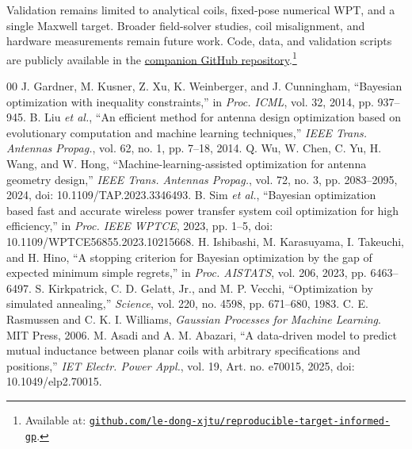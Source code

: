 \documentclass[10pt,conference,letterpaper]{IEEEtran}
\begin{document}
Validation remains limited to analytical coils, fixed-pose numerical WPT, and a single Maxwell target. Broader field-solver studies, coil misalignment, and hardware measurements remain future work. Code, data, and validation scripts are publicly available in the \href{https://github.com/le-dong-xjtu/reproducible-target-informed-gp}{companion GitHub repository}.\footnote{\raggedright Available at: \href{https://github.com/le-dong-xjtu/reproducible-target-informed-gp}{\texttt{github.com/le-dong-xjtu/\allowbreak reproducible-\allowbreak target-\allowbreak informed-\allowbreak gp}}.}

\begin{thebibliography}{00}
 J. Gardner, M. Kusner, Z. Xu, K. Weinberger, and J. Cunningham, ``Bayesian optimization with inequality constraints,'' in \emph{Proc. ICML}, vol. 32, 2014, pp. 937--945.
 B. Liu \emph{et al.}, ``An efficient method for antenna design optimization based on evolutionary computation and machine learning techniques,'' \emph{IEEE Trans. Antennas Propag.}, vol. 62, no. 1, pp. 7--18, 2014.
 Q. Wu, W. Chen, C. Yu, H. Wang, and W. Hong, ``Machine-learning-assisted optimization for antenna geometry design,'' \emph{IEEE Trans. Antennas Propag.}, vol. 72, no. 3, pp. 2083--2095, 2024, doi: 10.1109/TAP.2023.3346493.
 B. Sim \emph{et al.}, ``Bayesian optimization based fast and accurate wireless power transfer system coil optimization for high efficiency,'' in \emph{Proc. IEEE WPTCE}, 2023, pp. 1--5, doi: 10.1109/WPTCE56855.2023.10215668.
 H. Ishibashi, M. Karasuyama, I. Takeuchi, and H. Hino, ``A stopping criterion for Bayesian optimization by the gap of expected minimum simple regrets,'' in \emph{Proc. AISTATS}, vol. 206, 2023, pp. 6463--6497.
 S. Kirkpatrick, C. D. Gelatt, Jr., and M. P. Vecchi, ``Optimization by simulated annealing,'' \emph{Science}, vol. 220, no. 4598, pp. 671--680, 1983.
 C. E. Rasmussen and C. K. I. Williams, \emph{Gaussian Processes for Machine Learning}. MIT Press, 2006.
 M. Asadi and A. M. Abazari, ``A data-driven model to predict mutual inductance between planar coils with arbitrary specifications and positions,'' \emph{IET Electr. Power Appl.}, vol. 19, Art. no. e70015, 2025, doi: 10.1049/elp2.70015.
\end{thebibliography}
\end{document}
